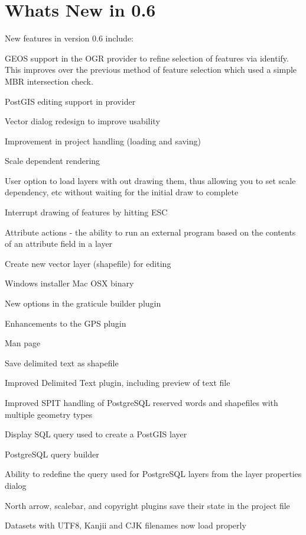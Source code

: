 \section{Whats New in 0.6}
New features in version 0.6 include:
\begin{compactenum}
\item GEOS support in the OGR provider to refine selection of features via identify. This improves over the previous method of feature selection which used a simple MBR intersection check.
\item PostGIS editing support in provider
\item Vector dialog redesign to improve usability
\item Improvement in project handling (loading and saving)
\item Scale dependent rendering
\item User option to load layers with out drawing them, thus allowing you to set scale dependency, etc without waiting for the initial draw to complete
\item Interrupt drawing of features by hitting ESC
\item Attribute actions - the ability to run an external program based on the contents of an attribute field in a layer
\item Create new vector layer (shapefile) for editing
\item Windows installer
 Mac OSX binary
\item New options in the graticule builder plugin
\item Enhancements to the GPS plugin
\item Man page
\item Save delimited text as shapefile
\item Improved Delimited Text plugin, including preview of text file
\item Improved SPIT handling of PostgreSQL reserved words and shapefiles with multiple geometry types
\item Display SQL query used to create a PostGIS layer
\item PostgreSQL query builder
\item Ability to redefine the query used for PostgreSQL layers from the layer properties dialog
\item North arrow, scalebar, and copyright plugins save their state in the project file
\item Datasets with UTF8, Kanjii and CJK filenames now load properly

\end{compactenum}

